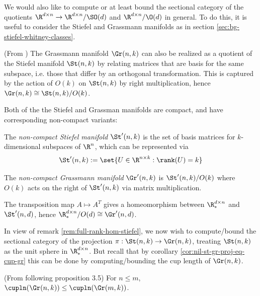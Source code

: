 We would also like to compute or at least bound the sectional category of the quotients $\R^{d \times n} \to \R^{d \times n} / \SO(d)$ and $\R^{d \times n} / \O(d)$ in general.
To do this, it is useful to consider the Stiefel and Grassmann manifolds as in section \ref{sec:bg-stiefel-whitney-classes}.


\begin{remark}
    (From \cite{bendokat2024grassmanhandbook})
    The Grassmann manifold $\Gr(n,k)$ can also be realized as a quotient of the Stiefel manifold $\St(n,k)$ by relating matrices that are basis for the same subspace, i.e. those that differ by an orthogonal transformation.
    This is captured by the action of $O(k)$ on $\St(n,k)$ by right multiplication, hence $\Gr(n,k) \cong \St(n,k) / O(k)$.
\end{remark}

Both of the the Stiefel and Grassman manifolds are compact, and have corresponding non-compact variants:

\begin{definition}
    The \emph{non-compact Stiefel manifold} $\St'(n,k)$ is the set of basis matrices for $k$-dimensional subspaces of $\R^n$, which can be represented via
    \[
        \St'(n,k) := \set{U \in \R^{n \times k} : \rank(U) = k}
    \]
\end{definition}

\begin{definition}
    The \emph{non-compact Grassmann manifold} $\Gr'(n,k)$ is $\St'(n,k) / O(k)$ where $O(k)$ acts on the right of $\St'(n,k)$ via matrix multiplication.
\end{definition}

\begin{remark}\label{rem:full-rank-hom-stiefel}
    The transposition map $A \mapsto A^T$ gives a homeomorphism between $\R^{d \times n}_*$ and $\St'(n,d)$, hence $\R^{d \times n}_* / O(d) \cong \Gr'(n,d)$.
\end{remark}

In view of remark \ref{rem:full-rank-hom-stiefel}, we now wish to compute/bound the sectional category of the projection $\pi : \St(n,k) \to \Gr(n,k)$, treating $\St(n,k)$ as the unit sphere in $\R^{d \times n}_*$.
But recall that by corollary \ref{cor:nil-st-gr-proj-eq-cup-gr} this can be done by computing/bounding the cup length of $\Gr(n,k)$.

\begin{proposition}\label{prop:cup-Grnk-monotonicity}
    (From \cite{pavesic2021} following proposition 3.5)
    For $n \leq m$, $\cupln(\Gr(n,k)) \leq \cupln(\Gr(m,k))$.
\end{proposition}


